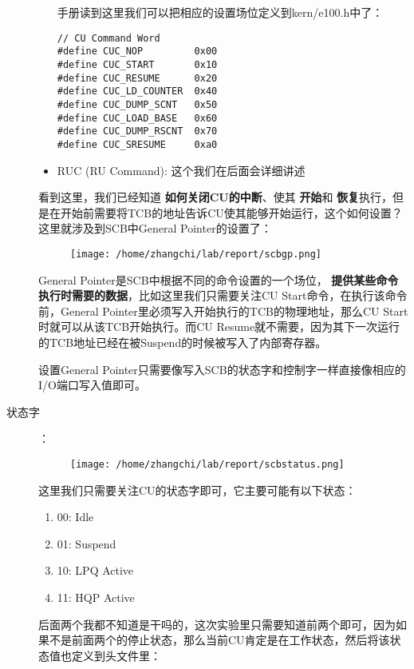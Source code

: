 \documentclass{article}
\newcommand{\highlight}[1]{{\bfseries \color{red}  #1}}
\begin{document}
\begin{CJK*}{UTF8}{gkai}
\begin{description}
\begin{itemize}
{手册读到这里我们可以把相应的设置场位定义到kern/e100.h中了：

\begin{lstlisting}[style=ccode, title={\scriptsize \ttfamily \bfseries kern/e100.h}]
// CU Command Word
#define CUC_NOP         0x00
#define CUC_START       0x10
#define CUC_RESUME      0x20
#define CUC_LD_COUNTER  0x40
#define CUC_DUMP_SCNT   0x50
#define CUC_LOAD_BASE   0x60
#define CUC_DUMP_RSCNT  0x70
#define CUC_SRESUME     0xa0
\end{lstlisting}

}
\item{RUC (RU Command): 这个我们在后面会详细讲述}
\end{itemize}

看到这里，我们已经知道\highlight{如何关闭CU的中断}、使其\highlight{开始}和\highlight{恢复}执行，但是在开始前需要将TCB的地址告诉CU使其能够开始运行，这个如何设置？这里就涉及到SCB中General Pointer的设置了：

\begin{figure}[htp]
\centering
\texttt{[image: /home/zhangchi/lab/report/scbgp.png]}
\end{figure}

General Pointer是SCB中根据不同的命令设置的一个场位，\highlight{提供某些命令执行时需要的数据}，比如这里我们只需要关注CU Start命令，在执行该命令前，General Pointer里必须写入开始执行的TCB的物理地址，那么CU Start时就可以从该TCB开始执行。而CU Resume就不需要，因为其下一次运行的TCB地址已经在被Suspend的时候被写入了内部寄存器。

设置General Pointer只需要像写入SCB的状态字和控制字一样直接像相应的I/O端口写入值即可。

\item[状态字]：\\
\begin{figure}[htp]
\centering
\texttt{[image: /home/zhangchi/lab/report/scbstatus.png]}
\end{figure}

这里我们只需要关注CU的状态字即可，它主要可能有以下状态：

\begin{enumerate}
\item{00: Idle}
\item{01: Suspend}
\item{10: LPQ Active}
\item{11: HQP Active}
\end{enumerate}

后面两个我都不知道是干吗的，这次实验里只需要知道前两个即可，因为如果不是前面两个的停止状态，那么当前CU肯定是在工作状态，然后将该状态值也定义到头文件里：



\end{description}
\end{CJK*}
\end{document}
